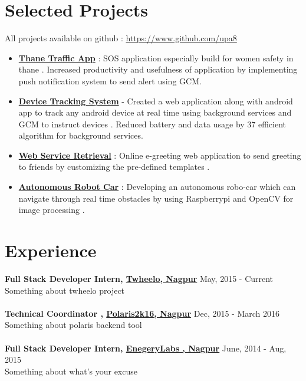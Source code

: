 \documentclass[margin, centered]{res}
\begin{document}
\begin{resume}

\section{Selected Projects}
All projects available on github : \url{https://www.github.com/upa8}
\begin{itemize}[leftmargin=*]
 \item \textbf{\href{https://github.com/upa8/Thane-Traffic-App}{Thane Traffic App}} : SOS application especially build for women safety in thane . Increased productivity 
and usefulness of application by implementing push notification system to send alert using GCM.
 \item \textbf{\href{https://github.com/upa8/Device-Tracking-System}{Device Tracking System}} - Created a web application along with android app to track any android device at real 
time  using background services and GCM to instruct devices . Reduced battery and data usage by 37%
efficient algorithm for background services. 
 \item \textbf{\href{http://cupidic.com/}{Web Service Retrieval}} : 
 Online e-greeting web application to send greeting to friends by customizing the pre-defined 
templates . 
 \item \textbf{\href{https://github.com/upa8/Autonomous-Robot-Car}{Autonomous Robot Car}} : Developing an autonomous robo-car which can navigate through real time obstacles by using Raspberrypi and OpenCV for image processing . 
\end{itemize}
 
\section{Experience}
\textbf{Full Stack Developer Intern, \href{http://www.twheelo.com}{Twheelo, Nagpur}} \hfill May, 2015 - Current\\
Something about twheelo project\\
\\
\textbf{Technical Coordinator , \href{http://www.polaris2k16.in/}{Polaris2k16, Nagpur}} \hfill Dec, 2015 - March 2016 \\
Something about polaris backend tool\\
\\
\textbf{Full Stack Developer Intern, \href{http://www.energylabs.in/}{EnegeryLabs , Nagpur}}
 \hfill June, 2014 - Aug, 2015 \\ 
Something about what's your excuse
\\


\end{resume}
\end{document}
